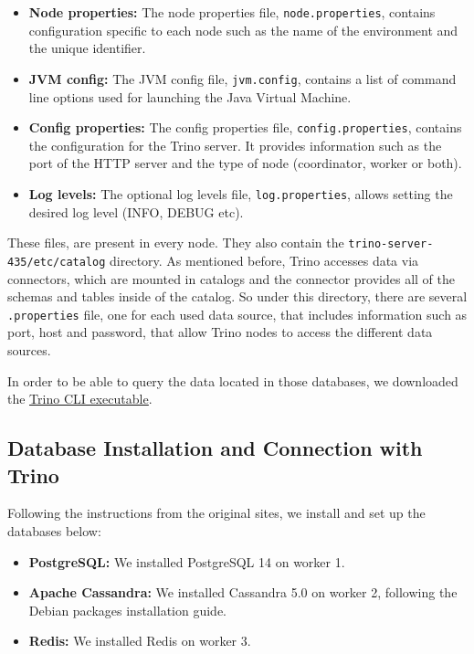 \documentclass[conference]{IEEEtran}
\begin{document}
\begin{itemize}
    \item \textbf{Node properties:} The node properties file, \texttt{node.properties}, contains configuration specific to each node such as the name of the environment and the unique identifier.
    \item \textbf{JVM config:} The JVM config file, \texttt{jvm.config}, contains a list of command line options used for launching the Java Virtual Machine.
    \item \textbf{Config properties:} The config properties file, \texttt{config.properties}, contains the configuration for the Trino server. It provides information such as the port of the HTTP server and the type of node (coordinator, worker or both).
    \item \textbf{Log levels:} The optional log levels file, \texttt{log.properties}, allows setting the desired log level (INFO, DEBUG etc).
\end{itemize}

These files, are present in every node. They also contain the \texttt{trino-server-435/etc/catalog} directory. As mentioned before, Trino accesses data via connectors, which are mounted in catalogs and the connector provides all
of the schemas and tables inside of the catalog. So under this directory, there are several \texttt{.properties} file, one for each used data source, that includes information such as port, host and password,
that allow Trino nodes to access the different data sources.

In order to be able to query the data located in those databases, we downloaded the \textcolor{linkblue}{\underline{\href{https://trino.io/docs/current/client/cli.html}{Trino CLI executable}}}.

\subsection{Database Installation and Connection with Trino}

Following the instructions from the original sites, we install and set up the databases below:

\begin{itemize}
    \item \textbf{PostgreSQL:} We installed PostgreSQL 14 on worker 1.
    \item \textbf{Apache Cassandra:} We installed Cassandra 5.0 on worker 2, following the Debian packages installation guide.
    \item \textbf{Redis:} We installed Redis on worker 3.
\end{itemize}
\end{document}
